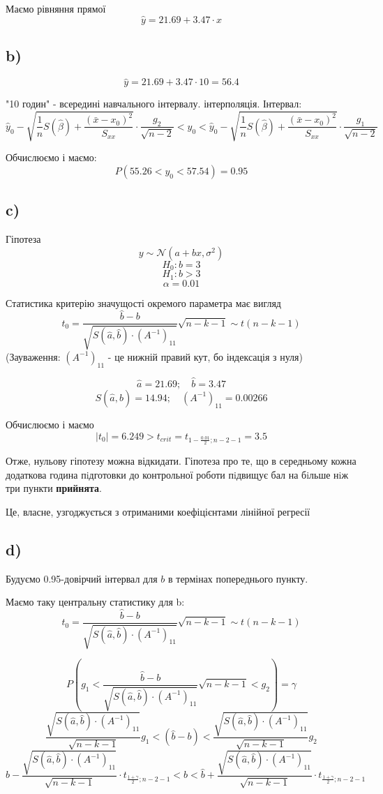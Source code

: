 \documentclass[11pt, a4paper]{article} %
\begin{document}
Маємо рівняння прямої 
$$\hat y = 21.69 + 3.47 \cdot x$$

\subsection*{b)}
$$\hat y = 21.69 + 3.47 \cdot 10 = 56.4$$

"10 годин" - всередині навчального інтервалу. інтерполяція. Інтервал:
$$\hat y_0 - \sqrt{\frac{1}{n}S(\hat \beta) + \frac{(\bar x - x_0)^2}{S_{xx}}} \cdot \frac{g_2}{\sqrt{n-2}} < y_0 < \hat y_0 - \sqrt{\frac{1}{n}S(\hat \beta) + \frac{(\bar x - x_0)^2}{S_{xx}}} \cdot \frac{g_1}{\sqrt{n-2}}$$

Обчислюємо і маємо:
$$P(55.26 < y_0 < 57.54) = 0.95$$

\subsection*{c)}
Гіпотеза
$$y \sim \mathcal N (a+bx, \sigma^2)$$
$$H_0 : b=3$$
$$H_1 : b>3$$
$$\alpha = 0.01$$

Статистика критерію значущості окремого параметра має вигляд
$$t_0 = \frac{\hat b - b}{\sqrt{S(\hat a, \hat b) \cdot \left(A^{-1}\right)_{11}}}\sqrt{n-k-1} \sim t(n-k-1)$$
(Зауваження: $\left(A^{-1}\right)_{11}$ - це нижній правий кут, бо індексація з нуля)

$$\hat a = 21.69; \quad \hat b = 3.47$$
$$S(\hat a, \hat b) = 14.94; \quad \left(A^{-1}\right)_{11} = 0.00266$$

Обчислюємо і маємо
$$|t_0| = 6.249 > t_{crit} = t_{1-\frac{0.01}{2};n-2-1} = 3.5$$

Отже, нульову гіпотезу можна відкидати. Гіпотеза про те, що в середньому кожна додаткова 
година пiдготовки до контрольної роботи пiдвищує бал на бiльше нiж три пункти \textbf{прийнята}.

Це, власне, узгоджується з отриманими коефіцієнтами лінійної регресії

\subsection*{d)}
Будуємо 0.95-довірчий інтервал для $b$ в термінах попереднього пункту.

Маємо таку центральну статистику для b:
$$t_0 = \frac{\hat b - b}{\sqrt{S(\hat a, \hat b) \cdot \left(A^{-1}\right)_{11}}}\sqrt{n-k-1} \sim t(n-k-1)$$

$$P(g_1 < \frac{\hat b - b}{\sqrt{S(\hat a, \hat b) \cdot \left(A^{-1}\right)_{11}}}\sqrt{n-k-1} < g_2) = \gamma$$
$$\frac{\sqrt{S(\hat a, \hat b) \cdot \left(A^{-1}\right)_{11}}}{\sqrt{n-k-1}} g_1 < (\hat b - b) < \frac{\sqrt{S(\hat a, \hat b) \cdot \left(A^{-1}\right)_{11}}}{\sqrt{n-k-1}} g_2$$
$$\hat b - \frac{\sqrt{S(\hat a, \hat b) \cdot \left(A^{-1}\right)_{11}}}{\sqrt{n-k-1}} \cdot t_{\frac{1+\gamma}{2};n-2-1} < b < \hat b + \frac{\sqrt{S(\hat a, \hat b) \cdot \left(A^{-1}\right)_{11}}}{\sqrt{n-k-1}} \cdot t_{\frac{1+\gamma}{2};n-2-1}$$
\end{document}

